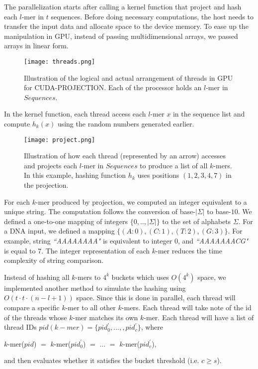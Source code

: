 \documentclass{llncs}
\begin{document}
{The parallelization starts after calling a kernel function that project and hash each $l$-mer in $t$ sequences. Before doing necessary computations, the host needs to transfer the input data and allocate space to the device memory.  To ease up the manipulation in GPU, instead of passing multidimensional arrays, we passed arrays in linear form.
\begin{figure}[h]
\centering
\texttt{[image: threads.png]}
\caption{Illustration of the logical and actual arrangement of threads in GPU for CUDA-PROJECTION. Each of the processor holds an $l$-mer in $Sequences$.   } 
\label{threads}
\end{figure}
 In the kernel function, each thread access each $l$-mer $x$ in the sequence list and compute $h_k(x)$ using the random numbers generated earlier.
\begin{figure}[h]
\centering
\texttt{[image: project.png]}
\caption{Illustration of how each thread (represented by an arrow) accesses and projects each $l$-mer in $Sequences$ to produce a list of all $k$-mers. In this example, hashing function $h_k$ uses positions $(1,2,3,4, 7)$ in the projection.}
\label{project}
\end{figure}

For each  $k$-mer produced by projection, we computed an integer equivalent to a unique string. The computation follows the conversion of  base-$|\Sigma|$   to base-$10$. We defined a one-to-one mapping of integers $\{0, .. ,|\Sigma|\}$ to the set of alphabets $\Sigma$. For a DNA input, we defined a mapping $\{(A:0), (C:1), (T:2), (G:3)\}$. For example, string \textit{``AAAAAAAA"} is equivalent to integer $0$, and \textit{``AAAAAAACG"} is equal to $7$. The integer representation of each $k$-mer reduces the time complexity of string comparison.

Instead of hashing all $k$-mers to $4^k$ buckets which uses $O(4^k)$ space,  we implemented another method to simulate the hashing using $O(t \cdot t \cdot (n -l +1) )$ space.  Since this is done in parallel, each thread will compare a specific $k$-mer to all other $k$-mers.  Each thread will take note of the id of the threads whose $k$-mer matches its own $k$-mer. Each thread will have a list of thread IDs $pid(k-mer) = \{pid^{'}_0, ..., ,pid^{'}_c\}$, where 
\begin{center}
 $k$-mer($pid$)  $=$  $k$-mer($pid^{'}_0$) $=$ $\ldots $ $=$ $k$-mer($pid^{'}_c$),
 \end{center}
 and then evaluates whether it satisfies the bucket threshold (i.e. $c\geq s$). 

}
\end{document}
